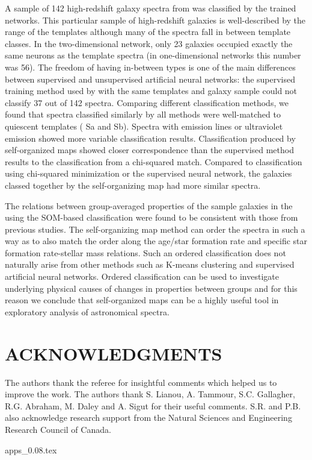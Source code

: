 \documentclass[useAMS,usenatbib]{mn2e}
\begin{document}
    A sample of 142 high-redshift galaxy spectra from  was classified by the trained networks.
  This particular sample of high-redshift galaxies is well-described by the range of the  templates although many of the spectra fall in between template classes.
     In the two-dimensional network, only 23 galaxies occupied exactly the same neurons as the  template spectra (in one-dimensional networks this number was 56).
    The freedom of having in-between types is one of the main differences between supervised and unsupervised artificial neural networks: the supervised training method used by    with the same templates and galaxy sample  could not classify 37 out of 142 spectra.
    Comparing different classification methods, we found that spectra classified similarly by all methods were well-matched to quiescent templates ( Sa and Sb). Spectra with emission lines or ultraviolet emission showed more variable classification results.
    Classification produced by self-organized maps showed closer correspondence than the supervised method results to the classification from a chi-squared match.
    Compared to classification using chi-squared minimization or the supervised neural network, the galaxies classed together by the self-organizing map had more similar spectra.


The relations between group-averaged properties of the sample galaxies in the using the SOM-based classification were found to be consistent with those from previous studies. 
    The self-organizing map method can order the spectra in such a way as to also match the order along the age/star formation rate and specific star formation rate-stellar mass relations.
    Such an ordered classification does not naturally arise from other methods such as K-means clustering and supervised artificial neural networks.
    Ordered classification can be used to investigate underlying physical causes of changes in properties between groups and for this reason we conclude that self-organized maps can be a highly useful tool in exploratory analysis of astronomical spectra.


\section*{ACKNOWLEDGMENTS}
The authors thank the referee for insightful comments which helped us to improve the work.
The authors thank S. Lianou, A. Tammour, S.C. Gallagher, R.G. Abraham, M. Daley and A. Sigut for their useful comments. 
S.R. and P.B. also acknowledge research support from the Natural Sciences and Engineering Research Council of Canada. 




{apps_0.08.tex}
\end{document}
